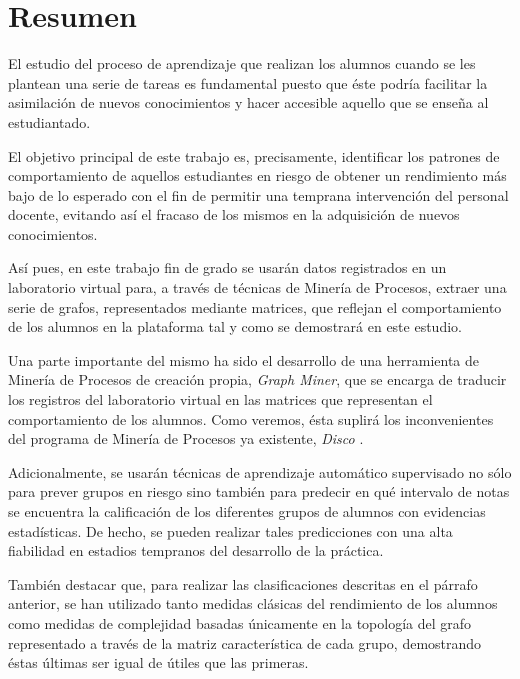 \chapter*{Resumen}


El estudio del proceso de aprendizaje que realizan los alumnos cuando se les plantean una serie de tareas es fundamental puesto que éste podría facilitar la asimilación de nuevos conocimientos y hacer accesible aquello que se enseña al estudiantado.

El objetivo principal de este trabajo es, precisamente, identificar los patrones de comportamiento de aquellos estudiantes en riesgo de obtener un rendimiento más bajo de lo esperado con el fin de permitir una temprana intervención del personal docente, evitando así el fracaso de los mismos en la adquisición de nuevos conocimientos.

Así pues, en este trabajo fin de grado se usarán datos registrados en un laboratorio virtual para, a través de técnicas de Minería de Procesos, extraer una serie de grafos, representados mediante matrices, que reflejan el comportamiento de los alumnos en la plataforma tal y como se demostrará en este estudio.

Una parte importante del mismo ha sido el desarrollo de una herramienta de Minería de Procesos de creación propia, \emph{Graph Miner}, que se encarga de traducir los registros del laboratorio virtual en las matrices que representan el comportamiento de los alumnos. Como veremos, ésta suplirá los inconvenientes del programa de Minería de Procesos ya existente, \emph{Disco} \cite{gunther2012disco}.

Adicionalmente, se usarán técnicas de aprendizaje automático supervisado no sólo para prever grupos en riesgo sino también para predecir en qué intervalo de notas se encuentra la calificación de los diferentes grupos de alumnos con evidencias estadísticas. De hecho, se pueden realizar tales predicciones con una alta fiabilidad en estadios tempranos del desarrollo de la práctica.

También destacar que, para realizar las clasificaciones descritas en el párrafo anterior, se han utilizado tanto medidas clásicas del rendimiento de los alumnos como medidas de complejidad basadas únicamente en la topología del grafo representado a través de la matriz característica de cada grupo, demostrando éstas últimas ser igual de útiles que las primeras.

